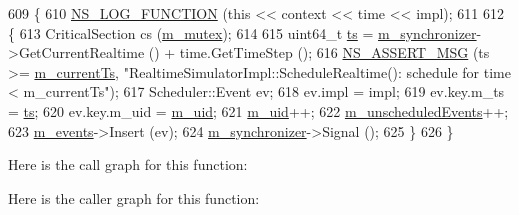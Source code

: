 \begin{DoxyCode}
609 \{
610   \hyperlink{log-macros-disabled_8h_a90b90d5bad1f39cb1b64923ea94c0761}{NS\_LOG\_FUNCTION} (\textcolor{keyword}{this} << context << time << impl);
611 
612   \{
613     CriticalSection cs (\hyperlink{classns3_1_1RealtimeSimulatorImpl_a02be368e7cbd8a6f9d62db36c3fd373b}{m\_mutex});
614 
615     uint64\_t \hyperlink{lte_2model_2fading-traces_2fading__trace__generator_8m_ada841f58d7be618bfbc76c87e7d44086}{ts} = \hyperlink{classns3_1_1RealtimeSimulatorImpl_a87a72268b521afcae7ea4c891c398d27}{m\_synchronizer}->GetCurrentRealtime () + time.GetTimeStep ();
616     \hyperlink{assert_8h_aff5ece9066c74e681e74999856f08539}{NS\_ASSERT\_MSG} (ts >= \hyperlink{classns3_1_1RealtimeSimulatorImpl_a613ff41dee1e66129c4d5cc81c00cf60}{m\_currentTs}, \textcolor{stringliteral}{"RealtimeSimulatorImpl::ScheduleRealtime():
       schedule for time < m\_currentTs"});
617     Scheduler::Event ev;
618     ev.impl = impl;
619     ev.key.m\_ts = \hyperlink{lte_2model_2fading-traces_2fading__trace__generator_8m_ada841f58d7be618bfbc76c87e7d44086}{ts};
620     ev.key.m\_uid = \hyperlink{classns3_1_1RealtimeSimulatorImpl_a733827168b695086e183a53f5a0dacf2}{m\_uid};
621     \hyperlink{classns3_1_1RealtimeSimulatorImpl_a733827168b695086e183a53f5a0dacf2}{m\_uid}++;
622     \hyperlink{classns3_1_1RealtimeSimulatorImpl_a1ef7b74c3be3d3febb1f07f8db44fb76}{m\_unscheduledEvents}++;
623     \hyperlink{classns3_1_1RealtimeSimulatorImpl_a0cccd690eafca8285f5cc4d3909a9593}{m\_events}->Insert (ev);
624     \hyperlink{classns3_1_1RealtimeSimulatorImpl_a87a72268b521afcae7ea4c891c398d27}{m\_synchronizer}->Signal ();
625   \}
626 \}
\end{DoxyCode}


Here is the call graph for this function\+:




Here is the caller graph for this function\+:


